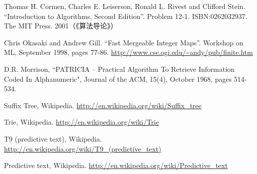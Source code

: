 \documentclass[b5paper]{ctexart}
\begin{document}
\ifx\wholebook\relax\else
\begin{thebibliography}{99}

Thomas H. Cormen, Charles E. Leiserson, Ronald L. Rivest and Clifford Stein.
``Introduction to Algorithms, Second Edition''. Problem 12-1. ISBN:0262032937. The MIT Press. 2001（《算法导论》）

Chris Okasaki and Andrew Gill. ``Fast Mergeable Integer Maps''. Workshop on ML, September 1998, pages 77-86.  \url{http://www.cse.ogi.edu/~andy/pub/finite.htm}

D.R. Morrison, ``PATRICIA -- Practical Algorithm To Retrieve  Information Coded In Alphanumeric", Journal of the ACM, 15(4), October 1968, pages 514-534.

Suffix Tree, Wikipedia. \url{http://en.wikipedia.org/wiki/Suffix_tree}

Trie, Wikipedia. \url{http://en.wikipedia.org/wiki/Trie}

T9 (predictive text), Wikipedia. \url{http://en.wikipedia.org/wiki/T9_(predictive_text)}

Predictive text,
Wikipedia. \url{http://en.wikipedia.org/wiki/Predictive_text}

\end{thebibliography}
\end{document}

